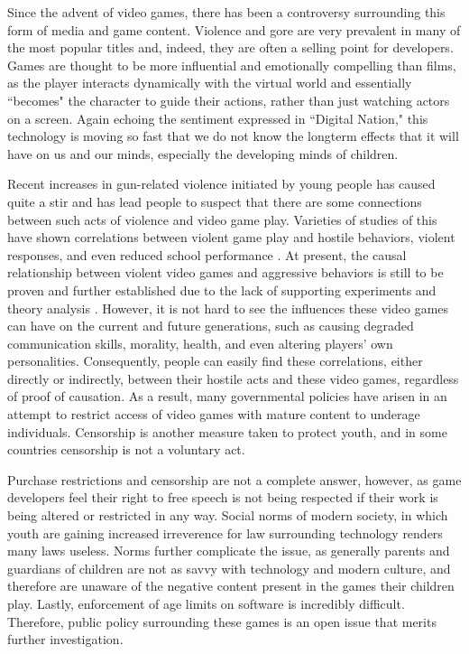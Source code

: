 

\indent\indent Since the advent of video games, there has been a controversy surrounding this form of media and game content. Violence and gore are very prevalent in many of the most popular titles and, indeed, they are often a selling point for developers. Games are thought to be more influential and emotionally compelling than films, as the player interacts dynamically with the virtual world and essentially ``becomes" the character to guide their actions, rather than just watching actors on a screen. Again echoing the sentiment expressed in ``Digital Nation," this technology is moving so fast that we do not know the longterm effects that it will have on us and our minds, especially the developing minds of children.

Recent increases in gun-related violence initiated by young people has caused quite a stir and has lead people to suspect that there are some connections between such acts of violence and video game play. Varieties of studies of this have shown correlations between violent game play and hostile behaviors, violent responses, and even reduced school performance \cite{barlett2009, gentile2004, anderson2003}. At present, the causal relationship between violent video games and aggressive behaviors is still to be proven and further established due to the lack of supporting experiments and theory analysis \cite{ferguson2013, ferguson2008,makuch2013,markey2014}. However, it is not hard to see the influences these video games can have on the current and future generations, such as causing degraded communication skills, morality, health, and even altering players' own personalities. Consequently, people can easily find these correlations, either directly or indirectly, between their hostile acts and these video games, regardless of proof of causation. As a result, many governmental policies have arisen in an attempt to restrict access of video games with mature content to underage individuals. Censorship is another measure taken to protect youth, and in some countries censorship is not a voluntary act.

Purchase restrictions and censorship are not a complete answer, however, as game developers feel their right to free speech is not being respected if their work is being altered or restricted in any way. Social norms of modern society, in which youth are gaining increased irreverence for law surrounding technology renders many laws useless. Norms further complicate the issue, as generally parents and guardians of children are not as savvy with technology and modern culture, and therefore are unaware of the negative content present in the games their children play. Lastly, enforcement of age limits on software is incredibly difficult. Therefore, public policy surrounding these games is an open issue that merits further investigation.

